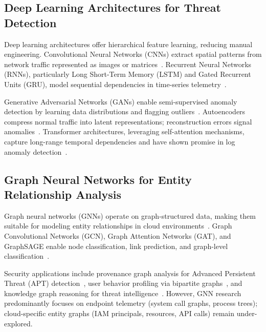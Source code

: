\subsection{Deep Learning Architectures for Threat Detection}
Deep learning architectures offer hierarchical feature learning, reducing manual engineering. Convolutional Neural Networks (CNNs) extract spatial patterns from network traffic represented as images or matrices~\cite{wang2017cnnids}. Recurrent Neural Networks (RNNs), particularly Long Short-Term Memory (LSTM) and Gated Recurrent Units (GRU), model sequential dependencies in time-series telemetry~\cite{staudemeyer2019lstmids}.

Generative Adversarial Networks (GANs) enable semi-supervised anomaly detection by learning data distributions and flagging outliers~\cite{zenati2018gananomalydetection}. Autoencoders compress normal traffic into latent representations; reconstruction errors signal anomalies~\cite{sakurada2014autoencoder}. Transformer architectures, leveraging self-attention mechanisms, capture long-range temporal dependencies and have shown promise in log anomaly detection~\cite{zhang2022logtransformer}.

\subsection{Graph Neural Networks for Entity Relationship Analysis}
Graph neural networks (GNNs) operate on graph-structured data, making them suitable for modeling entity relationships in cloud environments~\cite{wu2021gnnreview}. Graph Convolutional Networks (GCN), Graph Attention Networks (GAT), and GraphSAGE enable node classification, link prediction, and graph-level classification~\cite{velickovic2017gat,hamilton2017graphsage}.

Security applications include provenance graph analysis for Advanced Persistent Threat (APT) detection~\cite{milajerdi2019poirot}, user behavior profiling via bipartite graphs~\cite{wang2020gcnueba}, and knowledge graph reasoning for threat intelligence~\cite{pingle2019kgti}. However, GNN research predominantly focuses on endpoint telemetry (system call graphs, process trees); cloud-specific entity graphs (IAM principals, resources, API calls) remain under-explored.

